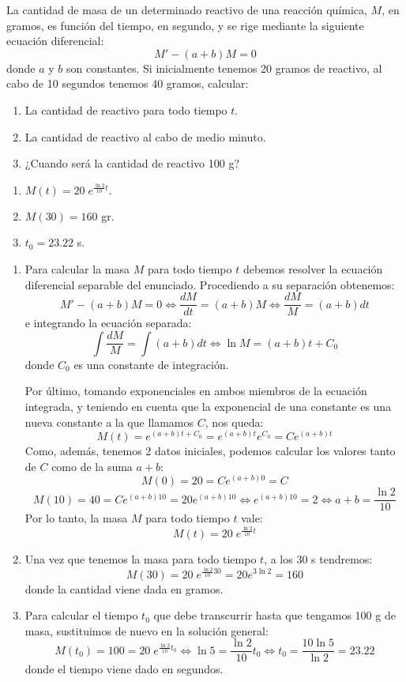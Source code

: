 {La cantidad de masa de un determinado reactivo de una reacción
química, $M$, en gramos, es función del tiempo, en segundo, y se
rige mediante la siguiente ecuación diferencial:
\[
M' - (a + b)M = 0
\]
donde $a$ y $b$ son constantes. Si inicialmente tenemos 20 gramos de reactivo, al cabo de 10 segundos tenemos 40 gramos, calcular:
\begin{enumerate}
\item La cantidad de reactivo para todo tiempo $t$.
\item La cantidad de reactivo al cabo de medio minuto.
\item ¿Cuando será la cantidad de reactivo 100 g?
\end{enumerate}
}
{\begin{enumerate}
\item $M(t) = 20\;e^{\frac{{\ln 2}}{{10}}t}.$
\item $M(30) = 160$ gr.
\item $t_0  = 23.22$ s.
\end{enumerate}
}
{
\begin{enumerate}
\item Para calcular la masa $M$ para todo tiempo $t$ debemos
resolver la ecuación diferencial separable del enunciado.
Procediendo a su separación obtenemos:
\[
M' - (a + b)M = 0 \Leftrightarrow \frac{{dM}}{{dt}} = (a + b)M
\Leftrightarrow \frac{{dM}}{M} = (a + b)dt
\]
e integrando la ecuación separada:
\[
\int {\frac{{dM}}{M}}  = \int {(a + b)dt}  \Leftrightarrow \ln M =
(a + b)t + C_0
\]
donde $C_0$ es una constante de integración.

Por último, tomando exponenciales en ambos miembros de la ecuación
integrada, y teniendo en cuenta que la exponencial de una constante
es una nueva constante a la que llamamos $C$, nos queda:
\[
M(t) = e^{(a + b)t + C_0 }  = e^{(a + b)t} e^{C_0 }  = Ce^{(a + b)t}
\]
Como, además, tenemos 2 datos iniciales, podemos calcular los
valores tanto de $C$ como de la suma $a+b$:
\[
M(0) = 20 = Ce^{(a + b)0}  = C
\]
\[
M(10) = 40 = Ce^{(a+b)10}=20e^{(a + b)10}  \Leftrightarrow e^{(a +
b)10} = 2 \Leftrightarrow a + b = \frac{{\ln 2}}{{10}}
\]
Por lo tanto, la masa $M$ para todo tiempo $t$ vale:
\[
M(t) = 20\;e^{\frac{{\ln 2}}{{10}}t}
\]

\item Una vez que tenemos la masa para todo tiempo $t$, a los 30 s
tendremos:
\[
M(30) = 20\;e^{\frac{{\ln 2}}{{10}}30}  = 20e^{3\ln 2}  = 160
\]
donde la cantidad viene dada en gramos.

\item Para calcular el tiempo $t_0$ que debe transcurrir hasta que
tengamos 100 g de masa, sustituimos de nuevo en la solución general:
\[
M(t_0 ) = 100 = 20\;e^{\frac{{\ln 2}}{{10}}t_0 }  \Leftrightarrow
\ln 5 = \frac{{\ln 2}}{{10}}t_0  \Leftrightarrow t_0  = \frac{{10\ln
5}}{{\ln 2}} = 23.22
\]
donde el tiempo viene dado en segundos.
\end{enumerate}
}


